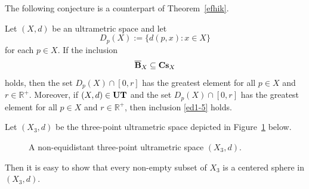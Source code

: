 \documentclass{article}
\begin{document}
The following conjecture is a counterpart of Theorem~\ref{efhik}.


\begin{Conjecture}
    \label{efhik-5}
Let $(X,d)$ be an ultrametric space and let 
\begin{equation*}
D_p(X) := \{ d(p,x) : x \in X \}
\end{equation*}
for each $p\in X$. 
If the inclusion 
\begin{equation}
    \label{ed1-5}
\overline{{\bf B}}_X \subseteq {\bf Cs}_X
\end{equation}
holds, then the set
$D_p(X)\cap [0,r]$ has the greatest element for all $p\in X$ and $r\in \mathbb R^+$. Moreover, if $(X,d)\in {\bf UT}$ and the set $D_p(X)\cap [0,r]$ has the greatest element for all $p\in X$ and $r\in \mathbb R^+$, then inclusion \eqref{ed1-5} holds.
\end{Conjecture}



Let $(X_3,d)$ be the three-point ultrametric space depicted in Figure~\ref{fig3} below.


\begin{figure}[h]
\begin{center}

\caption{A non-equidistant three-point ultrametric space $(X_3,d)$.}
\label{fig3}
\end{center}
\end{figure}


Then it is easy to show that every non-empty subset of $X_3$ is a centered sphere in $(X_3,d)$.
\end{document}
